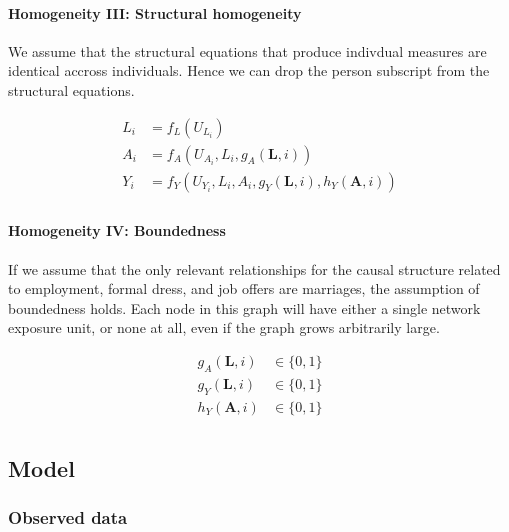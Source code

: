 \documentclass[
  letterpaper,
  DIV=11,
  numbers=noendperiod,
  oneside]{scrreprt}
\let\oldparagraph\paragraph
\renewcommand{\paragraph}[1]{\oldparagraph{#1}\mbox{}}
\begin{document}
\hypertarget{homogeneity-iii-structural-homogeneity}{%
\paragraph{Homogeneity III: Structural
homogeneity}\label{homogeneity-iii-structural-homogeneity}}

We assume that the structural equations that produce indivdual measures
are identical accross individuals. Hence we can drop the person
subscript from the structural equations.

\[
\begin{aligned}
L_i &= f_{L}(U_{L_i}) \\
A_i &= f_{A}(U_{A_i}, L_i, g_{A}(\mathbf{L}, i)) \\
Y_i &= f_{Y}(U_{Y_i}, L_i, A_i, g_{Y}(\mathbf{L}, i), h_{Y}(\mathbf{A}, i)) \\
\end{aligned}
\]

\hypertarget{homogeneity-iv-boundedness}{%
\paragraph{Homogeneity IV:
Boundedness}\label{homogeneity-iv-boundedness}}

If we assume that the only relevant relationships for the causal
structure related to employment, formal dress, and job offers are
marriages, the assumption of boundedness holds. Each node in this graph
will have either a single network exposure unit, or none at all, even if
the graph grows arbitrarily large.

\[
\begin{aligned}
g_{A}(\mathbf{L}, i) &\in \{0, 1\} \\
g_{Y}(\mathbf{L}, i) &\in \{0, 1\} \\
h_{Y}(\mathbf{A}, i) &\in \{0, 1\} \\
\end{aligned}
\]

\hypertarget{model-1}{%
\subsection{Model}\label{model-1}}

\hypertarget{observed-data-1}{%
\subsubsection{Observed data}\label{observed-data-1}}
\end{document}
